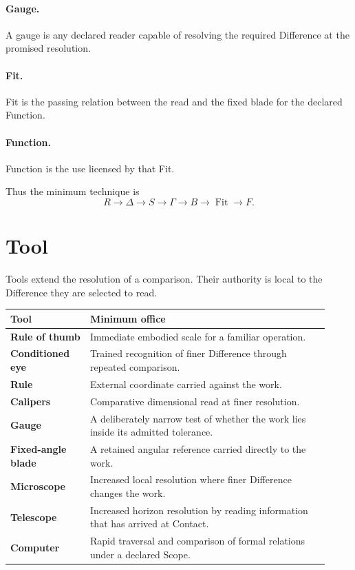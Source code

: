 \documentclass[10pt]{article}
\newcommand{\fit}{\operatorname{Fit}}
\begin{document}
\paragraph{Gauge.} A gauge is any declared reader capable of resolving the required Difference at the promised resolution.

\paragraph{Fit.} Fit is the passing relation between the read and the fixed blade for the declared Function.

\paragraph{Function.} Function is the use licensed by that Fit.

Thus the minimum technique is
\[
\boxed{R\to\Delta\to S\to\Gamma\to B\to\fit\to F.}
\]

\section{Tool}

Tools extend the resolution of a comparison. Their authority is local to the Difference they are selected to read.

\begin{center}
\renewcommand{\arraystretch}{1.18}
\begin{tabular}{>{\bfseries}p{0.23\linewidth}p{0.69\linewidth}}
\toprule
Tool & Minimum office \\
\midrule
Rule of thumb & Immediate embodied scale for a familiar operation. \\
Conditioned eye & Trained recognition of finer Difference through repeated comparison. \\
Rule & External coordinate carried against the work. \\
Calipers & Comparative dimensional read at finer resolution. \\
Gauge & A deliberately narrow test of whether the work lies inside its admitted tolerance. \\
Fixed-angle blade & A retained angular reference carried directly to the work. \\
Microscope & Increased local resolution where finer Difference changes the work. \\
Telescope & Increased horizon resolution by reading information that has arrived at Contact. \\
Computer & Rapid traversal and comparison of formal relations under a declared Scope. \\
\bottomrule
\end{tabular}
\end{center}
\end{document}

